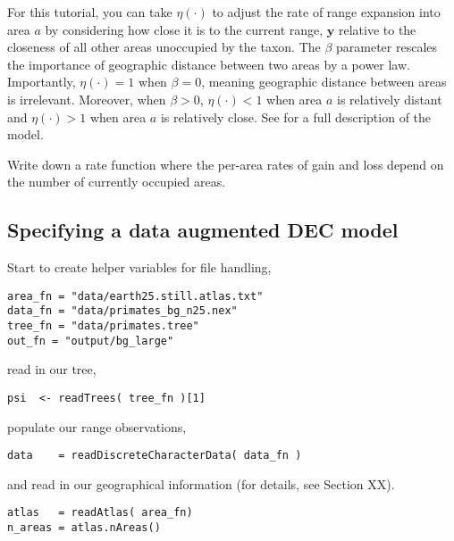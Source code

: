 For this tutorial, you can take $\eta(\cdot)$ to adjust the rate of range expansion into area $a$ by considering how close it is to the current range, $\textbf{y}$ relative to the closeness of all other areas unoccupied by the taxon.
The $\beta$ parameter rescales the importance of geographic distance between two areas by a power law.
Importantly, $\eta(\cdot) = 1$ when $\beta=0$, meaning geographic distance between areas is irrelevant.
Moreover, when $\beta > 0$, $\eta(\cdot) < 1$ when area $a$ is relatively distant and $\eta(\cdot) > 1$ when area $a$ is relatively close.
See \citet{Landis2013a} for a full description of the model.

{\bf {}} Write down a rate function where the per-area rates of gain and loss depend on the number of currently occupied areas.

\subsection{Specifying a data augmented DEC model}


Start to create helper variables for file handling,

\begin{snugshade}
\begin{lstlisting}
area_fn = "data/earth25.still.atlas.txt"
data_fn = "data/primates_bg_n25.nex"
tree_fn = "data/primates.tree"
out_fn = "output/bg_large"
\end{lstlisting}
\end{snugshade}

read in our tree,

\begin{snugshade}
\begin{lstlisting}
psi  <- readTrees( tree_fn )[1]
\end{lstlisting}
\end{snugshade}

populate our range observations,

\begin{snugshade}
\begin{lstlisting}
data    = readDiscreteCharacterData( data_fn )
\end{lstlisting}
\end{snugshade}

and read in our geographical information (for details, see Section XX).

\begin{snugshade}
\begin{lstlisting}
atlas   = readAtlas( area_fn)
n_areas = atlas.nAreas()
\end{lstlisting}
\end{snugshade}

